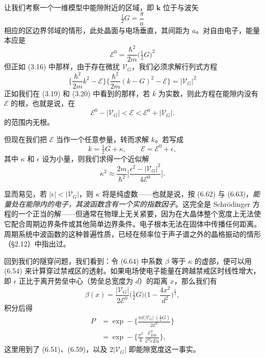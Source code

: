 让我们考察一个一维模型中能隙附近的区域，即 $\mathbf{k}$ 位于与波矢
\begin{equation*}
\tfrac{1}{2}G=\frac{\pi}{a} \tag{6.59}
\end{equation*}
相应的区边界邻域的情形，此处晶面与电场垂直，其间距为 $a$。对自由电子，能量本应是
\begin{equation*}
\mathcal{E}^{0}=\frac{\hbar^{2}}{2m}\bigl(\tfrac{1}{2}G\bigr)^{2} \tag{6.60}
\end{equation*}
但正如 (3.16) 中那样，由于存在微扰 $\mathcal{V}_{G}$，我们必须求解行列式方程
\begin{equation*}
\biggl\{\frac{\hbar^{2}}{2m}k^{2}-\mathcal{E}\biggr\}\biggl\{\frac{\hbar^{2}}{2m}(k-G)^{2}-\mathcal{E}\biggr\}=|\mathcal{V}_{G}|^{2} \tag{6.61}
\end{equation*}
正如我们在 (3.19) 和 (3.20) 中看到的那样，若 $k$ 为实数，则此方程在能隙内没有 $\mathcal{E}$ 的根，也就是说，在
\begin{equation*}
\mathcal{E}^{0}-|\mathcal{V}_{G}|<\mathcal{E}<\mathcal{E}^{0}+|\mathcal{V}_{G}|. \tag{6.62}
\end{equation*}
的范围内无根。

但现在我们把 $\mathcal{E}$ 当作一个任意参量，转而求解 $k$。若写成
\begin{equation*}
k=\tfrac{1}{2}G+\kappa,\qquad\mathcal{E}=\mathcal{E}^{0}+\epsilon, \tag{6.63}
\end{equation*}
其中 $\kappa$ 和 $\epsilon$ 设为小量，则我们求得一个近似解
\begin{equation*}
\kappa^{2}\approx\frac{2m}{\hbar^{2}}\biggl[\frac{\epsilon^{2}-|\mathcal{V}_{G}|^{2}}{4\mathcal{E}^{0}}\biggr]. \tag{6.64}
\end{equation*}

显而易见，若 $|\epsilon|<|\mathcal{V}_{G}|$，则 $\kappa$ 将是纯虚数——也就是说，按 (6.62) 与 (6.63)，\emph{能量处在能隙内的电子，其波函数含有一个实的指数因子}。这完全是 Schrödinger 方程的一个正当的解——但通常在物理上无关紧要，因为在大晶体整个宽度上无法使它配合周期边界条件或其他简单边界条件。电子根本无法在固体中传播任何距离。周期系统中波函数的这种普遍性质，已经在频率位于声子谱之外的晶格振动的情形（§2.12）中指出过。

回到我们的隧穿问题，我们看到：令 (6.64) 中系数 $\beta$ 等于 $\kappa$ 的虚部，便可以用 (6.54) 来计算穿过禁戒区的透射。如果电场使电子能量在跨越禁戒区时线性增大，即 $\epsilon$ 正比于离开势垒中心（势垒总宽度为 $d$）的距离 $x$，那么我们有
\begin{equation*}
\beta(x)=\frac{|\mathcal{V}_{G}|}{2\mathcal{E}^{0}}\bigl(\tfrac{1}{2}G\bigr)\biggl(1-\frac{4x^{2}}{d^{2}}\biggr)^{\frac{1}{2}},
\end{equation*}
积分后得
\begin{align*}
P&=\exp-\biggl\{\frac{\pi d\,|\mathcal{V}_{G}|\,(\tfrac{1}{2}G)}{2\mathcal{E}^{0}}\biggr\}\\
&=\exp-\biggl\{\frac{\pi^{2}}{4}\,\frac{\mathcal{E}_{\mathrm{gap}}^{2}}{\mathcal{E}^{0}eEa}\biggr\}, \tag{6.65}
\end{align*}
这里用到了 (6.51)、(6.59)，以及 $2|\mathcal{V}_{G}|$ 即能隙宽度这一事实。

